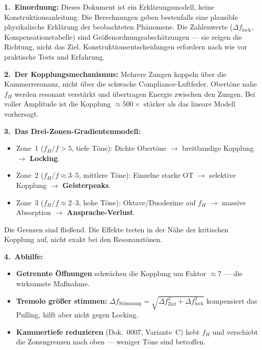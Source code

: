 \documentclass[11pt,a4paper]{article}
\begin{document}
\begin{warnbox}
\textbf{1.\ Einordnung:} Dieses Dokument ist ein Erklärungsmodell, keine Konstruktionsanleitung. Die Berechnungen geben bestenfalls eine plausible physikalische Erklärung der beobachteten Phänomene. Die Zahlenwerte ($\Delta f_\text{lock}$, Kompensationstabelle) sind Größenordnungsabschätzungen --- sie zeigen die Richtung, nicht das Ziel. Konstruktionsentscheidungen erfordern nach wie vor praktische Tests und Erfahrung.
\end{warnbox}

\begin{keybox}
\textbf{2.\ Der Kopplungsmechanismus:} Mehrere Zungen koppeln über die Kammerresonanz, nicht über die schwache Compliance-Luftfeder. Obertöne nahe $f_H$ werden resonant verstärkt und übertragen Energie zwischen den Zungen. Bei voller Amplitude ist die Kopplung $\approx 500\times$ stärker als das lineare Modell vorhersagt.
\end{keybox}

\begin{keybox}
\textbf{3.\ Das Drei-Zonen-Gradientenmodell:}
\begin{itemize}[leftmargin=5mm, itemsep=1pt]
\item \textcolor{zone1blue}{Zone~1} ($f_H/f > 5$, tiefe Töne): Dichte Obertöne $\to$ breitbandige Kopplung $\to$ \textbf{Locking}.
\item \textcolor{zone2orange}{Zone~2} ($f_H/f \approx 3$--$5$, mittlere Töne): Einzelne starke OT $\to$ selektive Kopplung $\to$ \textbf{Geisterpeaks}.
\item \textcolor{zone3red}{Zone~3} ($f_H/f \approx 2$--$3$, hohe Töne): Oktave/Duodezime auf $f_H$ $\to$ massive Absorption $\to$ \textbf{Ansprache-Verlust}.
\end{itemize}
Die Grenzen sind fließend. Die Effekte treten in der Nähe der kritischen Kopplung auf, nicht exakt bei den Resonanztönen.
\end{keybox}

\begin{keybox}
\textbf{4.\ Abhilfe:}
\begin{itemize}[leftmargin=5mm, itemsep=1pt]
\item \textbf{Getrennte Öffnungen} schwächen die Kopplung um Faktor $\approx 7$ --- die wirksamste Maßnahme.
\item \textbf{Tremolo größer stimmen:} $\Delta f_\text{Stimmung} = \sqrt{\Delta f_\text{Ziel}^2 + \Delta f_\text{lock}^2}$ kompensiert das Pulling, hilft aber nicht gegen Locking.
\item \textbf{Kammertiefe reduzieren} (Dok.~0007, Variante~C) hebt $f_H$ und verschiebt die Zonengrenzen nach oben --- weniger Töne sind betroffen.
\end{itemize}
\end{keybox}
\end{document}

